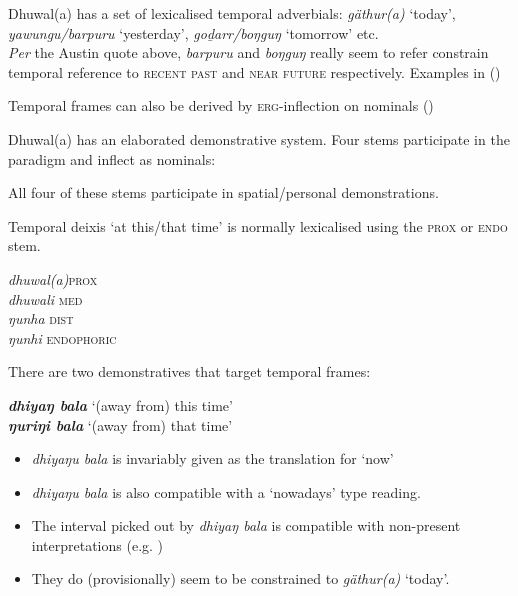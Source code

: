 \documentclass[11pt,dvipsnames]{article}
\begin{document}
\begin{itemize}
	\item Dhuwal(a) has a set of lexicalised temporal adverbials: \textit{gäthur(a)} `today', \textit{yawungu/barpuru} `yesterday', \textit{goḏarr/boŋguŋ} `tomorrow' etc.\\
	\textit{Per} the Austin quote above, \textit{barpuru} and \textit{boŋguŋ} really seem to refer constrain temporal reference to \textsc{recent past} and \textsc{near future} respectively. Examples in ()
	

	
	\item Temporal frames can also be derived by \textsc{erg}-inflection on nominals ()
	

	\begin{minipage}[t]{.65\textwidth}


	
	\item Dhuwal(a) has an elaborated demonstrative system. Four stems participate in the paradigm and inflect as nominals:


\item All four of these stems participate in spatial/personal demonstrations.

Temporal deixis `at this/that time' is normally lexicalised using the \textsc{prox} or \textsc{endo} stem.
	\end{minipage}\hfill
\begin{minipage}[t]{.2\textwidth}
\begin{tabbing}
	\textit{dhuwal(a)}\quad \=  \textsc{prox}\\
	\textit{dhuwali}  \> \textsc{med}\\
	\textit{ŋunha} \> \textsc{dist}\\
	\textit{ŋunhi} \> \textsc{endophoric}
\end{tabbing}
\end{minipage}

\item There are two demonstratives that target temporal frames:

\textit{\textbf{dhiyaŋ bala}} `(away from) this time'\\
\textbf{\textit{ŋuriŋi bala}} `(away from) that time'

\begin{itemize}
	\item \textit{dhiyaŋu bala} is invariably given as the translation for `now' 
	\item \textit{dhiyaŋu bala} is also compatible with a `nowadays' type reading.
	\item The interval picked out by \textit{dhiyaŋ bala} is compatible with non-present interpretations (e.g. )
	\item They do (provisionally) seem to be constrained to \textit{gäthur(a)} `today'.
	

\end{itemize}
\end{itemize}
\end{document}

